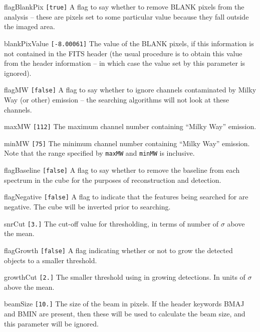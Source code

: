 \begin{entry}
\item[flagBlankPix \texttt{[true]}] A flag to say whether to remove
  BLANK pixels from the analysis -- these are pixels set to some
  particular value because they fall outside the imaged area.
\item[blankPixValue \texttt{[-8.00061]}] The value of the BLANK
  pixels, if this information is not contained in the FITS header (the
  usual procedure is to obtain this value from the header information
  -- in which case the value set by this parameter is ignored).
\item[flagMW \texttt{[false]}] A flag to say whether to ignore
  channels contaminated by Milky Way (or other) emission -- the
  searching algorithms will not look at these channels.
\item[maxMW \texttt{[112]}] The maximum channel number containing
  ``Milky Way'' emission.
\item[minMW \texttt{[75]}] The minimum channel number containing
  ``Milky Way'' emission. Note that the range specified by
  \texttt{maxMW} and \texttt{minMW} is inclusive.
\item[flagBaseline \texttt{[false]}] A flag to say whether to remove
  the baseline from each spectrum in the cube for the purposes of
  reconstruction and detection.
\end{entry}


\begin{entry}
\item[flagNegative \texttt{[false]}] A flag to indicate that the
  features being searched for are negative. The cube will be inverted
  prior to searching.
\item[snrCut \texttt{[3.]}] The cut-off value for thresholding, in
  terms of number of $\sigma$ above the mean.
\item[flagGrowth \texttt{[false]}] A flag indicating whether or not to
  grow the detected objects to a smaller threshold.
\item[growthCut \texttt{[2.]}] The smaller threshold using in growing
  detections. In units of $\sigma$ above the mean.
\item[beamSize \texttt{[10.]}] The size of the beam in pixels. If the
  header keywords BMAJ and BMIN are present, then these will be used
  to calculate the beam size, and this parameter will be ignored. 
\end{entry}

